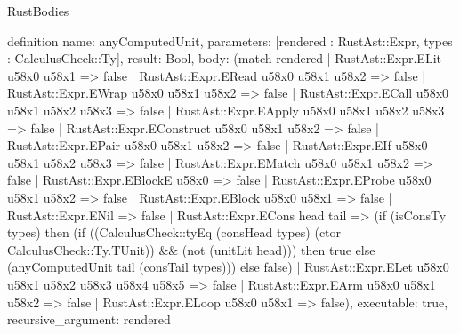 \begin{lexlean}{RustBodies}
\begin{semanticmodule}
definition{
  name: anyComputedUnit,
  parameters: [rendered : RustAst::Expr, types : CalculusCheck::Ty],
  result: Bool,
  body: (match rendered
    | RustAst::Expr.ELit u58x0 u58x1 => false
    | RustAst::Expr.ERead u58x0 u58x1 u58x2 => false
    | RustAst::Expr.EWrap u58x0 u58x1 u58x2 => false
    | RustAst::Expr.ECall u58x0 u58x1 u58x2 u58x3 => false
    | RustAst::Expr.EApply u58x0 u58x1 u58x2 u58x3 => false
    | RustAst::Expr.EConstruct u58x0 u58x1 u58x2 => false
    | RustAst::Expr.EPair u58x0 u58x1 u58x2 => false
    | RustAst::Expr.EIf u58x0 u58x1 u58x2 u58x3 => false
    | RustAst::Expr.EMatch u58x0 u58x1 u58x2 => false
    | RustAst::Expr.EBlockE u58x0 => false
    | RustAst::Expr.EProbe u58x0 u58x1 u58x2 => false
    | RustAst::Expr.EBlock u58x0 u58x1 => false
    | RustAst::Expr.ENil => false
    | RustAst::Expr.ECons head tail => (if (isConsTy types) then (if ((CalculusCheck::tyEq (consHead types) (ctor CalculusCheck::Ty.TUnit)) && (not (unitLit head))) then true else (anyComputedUnit tail (consTail types))) else false)
    | RustAst::Expr.ELet u58x0 u58x1 u58x2 u58x3 u58x4 u58x5 => false
    | RustAst::Expr.EArm u58x0 u58x1 u58x2 => false
    | RustAst::Expr.ELoop u58x0 u58x1 => false),
  executable: true,
  recursive_argument: rendered
}


\end{semanticmodule}
\end{lexlean}
